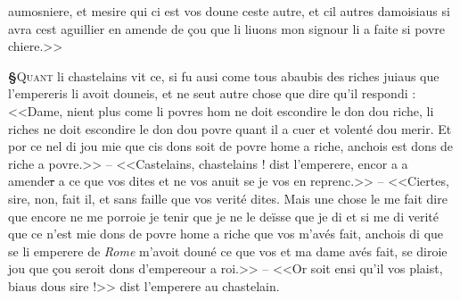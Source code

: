 \documentclass[12pt]{article} %
\newcommand{\placeName}[1]{\emph{#1}} %
\newcommand{\supplied}[1]{\textlangle#1\textrangle} %
\newcommand{\del}[1]{\sout{#1}}      %
\newcounter{paranum}
\newcommand{\pnum}{\stepcounter{paranum}\textbf{§\arabic{paranum}}\quad}
\begin{document}
aumosniere, et mesire qui ci est vos doune ceste autre, et cil autres damoisiaus si avra cest aguillier en amende de çou que li liuons mon signour li a faite si povre chiere.>>


\pnum \lettrine[lines=2]{\color{darkblue}Q}{uant} li chastelains vit ce, si fu ausi come tous abaubis des riches juiaus que l'empereris li avoit douneis, et ne seut autre chose que dire qu'il respondi : <<Dame, nient plus come li povres hom ne doit escondire le don dou riche, li riche\supplied{s} ne doit escondire le don dou povre quant il a cuer et volenté dou merir. Et por ce nel di jou mie que cis dons soit de povre home a riche, anchois est dons de riche a povre.>> -- <<Castelains, chastelains ! dist l'emperere, encor a a amende\del{r} a ce que vos dites et ne vos anuit se je vos en reprenc.>> -- <<Ciertes, sire, non, fait il, et sans faille que vos verité dites. Mais une chose le me fait dire que encore ne me porroie je tenir que je ne le deïsse que je di et si me di verité que ce n'est mie dons de povre home a riche que vos m'avés fait, anchois di que se li emperere de \placeName{Rome} m'avoit douné ce que vos et ma dame avés fait, se diroie jou que çou seroit dons d'empereour a roi.>> -- <<Or soit ensi qu'il vos plaist, biaus dous sire !>> dist l'emperere au chastelain.
\end{document}
